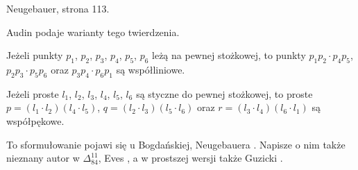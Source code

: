 \begin{proposition}
	Neugebauer, strona 113.
\end{proposition}

Audin \cite[s. 103, 107, 209]{audin_2003} podaje warianty tego twierdzenia.

\begin{theorem}[Pascala]
	Jeżeli punkty $p_1$, $p_2$, $p_3$, $p_4$, $p_5$, $p_6$ leżą na pewnej stożkowej, to punkty $p_1p_2 \cdot p_4p_5$, $p_2p_3 \cdot p_5p_6$ oraz $p_3p_4 \cdot p_6p_1$ są współliniowe.
\end{theorem}

\begin{theorem}[Brianchona]
	Jeżeli proste $l_1$, $l_2$, $l_3$, $l_4$, $l_5$, $l_6$ są styczne do pewnej stożkowej, to proste $p = (l_1 \cdot l_2)(l_4 \cdot l_5)$, $q = (l_2 \cdot l_3)(l_5 \cdot l_6)$ oraz $r = (l_3 \cdot l_4)(l_6 \cdot l_1)$ są współpękowe.
\end{theorem}


To sformułowanie pojawi się u Bogdańskiej, Neugebauera \cite[s. 265, 266]{neugebauer_2018}.
Napisze o nim także nieznany autor w $\Delta_{84}^{11}$, Eves \cite[s. 143]{eves1_1972}, a w prostszej wersji także Guzicki \cite[s. 238]{guzicki_2021}.